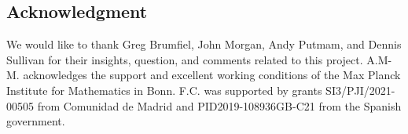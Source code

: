 
\subsection*{Acknowledgment}

We would like to thank Greg Brumfiel, John Morgan, Andy Putmam, and Dennis Sullivan for their insights, question, and comments related to this project.
A.M-M. acknowledges the support and excellent working conditions of the Max Planck Institute for Mathematics in Bonn.
F.C. was supported by grants SI3/PJI/2021-00505 from Comunidad de Madrid and PID2019-108936GB-C21 from the Spanish government.